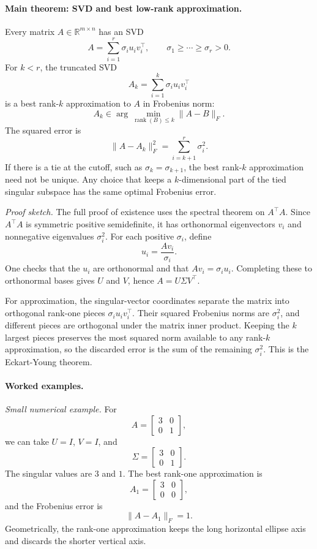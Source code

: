 \paragraph{Main theorem: SVD and best low-rank approximation.}
Every matrix \(A\in\mathbb{R}^{m\times n}\) has an SVD
\[
A=\sum_{i=1}^r\sigma_i u_i v_i^\top,
\qquad
\sigma_1\geq\cdots\geq\sigma_r>0.
\]
For \(k<r\), the truncated SVD
\[
A_k=\sum_{i=1}^k\sigma_i u_i v_i^\top
\]
is a best rank-\(k\) approximation to \(A\) in Frobenius norm:
\[
A_k\in\arg\min_{\operatorname{rank}(B)\leq k}\|A-B\|_F.
\]
The squared error is
\[
\|A-A_k\|_F^2=\sum_{i=k+1}^r\sigma_i^2.
\]
If there is a tie at the cutoff, such as \(\sigma_k=\sigma_{k+1}\), the best rank-\(k\) approximation need not be unique. Any choice that keeps a \(k\)-dimensional part of the tied singular subspace has the same optimal Frobenius error.

\emph{Proof sketch.} The full proof of existence uses the spectral theorem on \(A^\top A\). Since \(A^\top A\) is symmetric positive semidefinite, it has orthonormal eigenvectors \(v_i\) and nonnegative eigenvalues \(\sigma_i^2\). For each positive \(\sigma_i\), define
\[
u_i=\frac{Av_i}{\sigma_i}.
\]
One checks that the \(u_i\) are orthonormal and that \(Av_i=\sigma_i u_i\). Completing these to orthonormal bases gives \(U\) and \(V\), hence \(A=U\Sigma V^\top\).

For approximation, the singular-vector coordinates separate the matrix into orthogonal rank-one pieces \(\sigma_i u_i v_i^\top\). Their squared Frobenius norms are \(\sigma_i^2\), and different pieces are orthogonal under the matrix inner product. Keeping the \(k\) largest pieces preserves the most squared norm available to any rank-\(k\) approximation, so the discarded error is the sum of the remaining \(\sigma_i^2\). This is the Eckart-Young theorem.

\paragraph{Worked examples.}
\emph{Small numerical example.} For
\[
A=
\begin{bmatrix}
3&0\\
0&1
\end{bmatrix},
\]
we can take \(U=I\), \(V=I\), and
\[
\Sigma=
\begin{bmatrix}
3&0\\
0&1
\end{bmatrix}.
\]
The singular values are \(3\) and \(1\). The best rank-one approximation is
\[
A_1=
\begin{bmatrix}
3&0\\
0&0
\end{bmatrix},
\]
and the Frobenius error is
\[
\|A-A_1\|_F=1.
\]
Geometrically, the rank-one approximation keeps the long horizontal ellipse axis and discards the shorter vertical axis.

